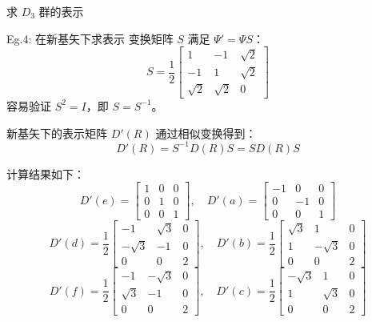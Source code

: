 \begin{example}{求 $D_3$ 群的表示}
\begin{example}{Eg.4: 在新基矢下求表示}
        变换矩阵 $S$ 满足 $\Psi' = \Psi S$：
        \begin{equation}
            S = \frac{1}{2} \begin{bmatrix} 1 & -1 & \sqrt{2} \\ -1 & 1 & \sqrt{2} \\ \sqrt{2} & \sqrt{2} & 0 \end{bmatrix}
        \end{equation}
        容易验证 $S^2 = I$，即 $S = S^{-1}$。

        新基矢下的表示矩阵 $D'(R)$ 通过相似变换得到：
        \begin{equation}
            D'(R) = S^{-1}D(R)S = S D(R) S
        \end{equation}
        
        计算结果如下：
        \begin{equation}
            D'(e) = \begin{bmatrix} 1 & 0 & 0 \\ 0 & 1 & 0 \\ 0 & 0 & 1 \end{bmatrix}, \quad
            D'(a) = \begin{bmatrix} -1 & 0 & 0 \\ 0 & -1 & 0 \\ 0 & 0 & 1 \end{bmatrix}
        \end{equation}
        \begin{equation}
            D'(d) = \frac{1}{2} \begin{bmatrix} -1 & \sqrt{3} & 0 \\ -\sqrt{3} & -1 & 0 \\ 0 & 0 & 2 \end{bmatrix}, \quad
            D'(b) = \frac{1}{2} \begin{bmatrix} \sqrt{3} & 1 & 0 \\ 1 & -\sqrt{3} & 0 \\ 0 & 0 & 2 \end{bmatrix}
        \end{equation}
        \begin{equation}
            D'(f) = \frac{1}{2} \begin{bmatrix} -1 & -\sqrt{3} & 0 \\ \sqrt{3} & -1 & 0 \\ 0 & 0 & 2 \end{bmatrix}, \quad
            D'(c) = \frac{1}{2} \begin{bmatrix} -\sqrt{3} & 1 & 0 \\ 1 & \sqrt{3} & 0 \\ 0 & 0 & 2 \end{bmatrix}
        \end{equation}
        


\end{example}
\end{example}
